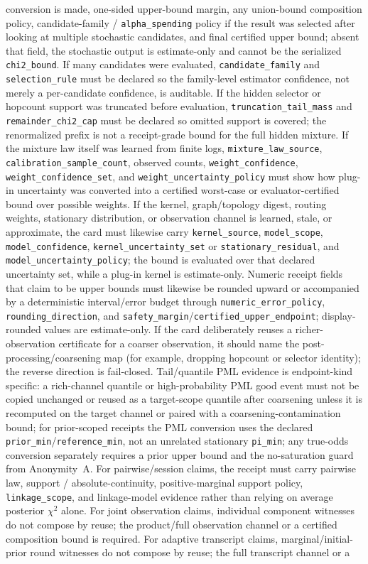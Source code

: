 \documentclass[11pt]{article}
\begin{document}
conversion is made, one-sided upper-bound margin, any union-bound composition policy, candidate-family / \nolinkurl{alpha_spending} policy if the result was selected after looking at multiple stochastic candidates, and final certified upper bound; absent that field, the stochastic output is estimate-only and cannot be the serialized \texttt{chi2\_bound}. If many candidates were evaluated, \nolinkurl{candidate_family} and \nolinkurl{selection_rule} must be declared so the family-level estimator confidence, not merely a per-candidate confidence, is auditable. If the hidden selector or hopcount support was truncated before evaluation, \nolinkurl{truncation_tail_mass} and \nolinkurl{remainder_chi2_cap} must be declared so omitted support is covered; the renormalized prefix is not a receipt-grade bound for the full hidden mixture. If the mixture law itself was learned from finite logs, \nolinkurl{mixture_law_source}, \nolinkurl{calibration_sample_count}, observed counts, \nolinkurl{weight_confidence}, \nolinkurl{weight_confidence_set}, and \nolinkurl{weight_uncertainty_policy} must show how plug-in uncertainty was converted into a certified worst-case or evaluator-certified bound over possible weights. If the kernel, graph/topology digest, routing weights, stationary distribution, or observation channel is learned, stale, or approximate, the card must likewise carry \nolinkurl{kernel_source}, \nolinkurl{model_scope}, \nolinkurl{model_confidence}, \nolinkurl{kernel_uncertainty_set} or \nolinkurl{stationary_residual}, and \nolinkurl{model_uncertainty_policy}; the bound is evaluated over that declared uncertainty set, while a plug-in kernel is estimate-only. Numeric receipt fields that claim to be upper bounds must likewise be rounded upward or accompanied by a deterministic interval/error budget through \nolinkurl{numeric_error_policy}, \nolinkurl{rounding_direction}, and \nolinkurl{safety_margin}/\nolinkurl{certified_upper_endpoint}; display-rounded values are estimate-only. If the card deliberately reuses a richer-observation certificate for a coarser observation, it should name the post-processing/coarsening map (for example, dropping hopcount or selector identity); the reverse direction is fail-closed. Tail/quantile PML evidence is endpoint-kind specific: a rich-channel quantile or high-probability PML good event must not be copied unchanged or reused as a target-scope quantile after coarsening unless it is recomputed on the target channel or paired with a coarsening-contamination bound; for prior-scoped receipts the PML conversion uses the declared \texttt{prior\_min}/\texttt{reference\_min}, not an unrelated stationary \texttt{pi\_min}; any true-odds conversion separately requires a prior upper bound and the no-saturation guard from Anonymity~A. For pairwise/session claims, the receipt must carry pairwise law, support / absolute-continuity, positive-marginal support policy, \texttt{linkage\_scope}, and linkage-model evidence rather than relying on average posterior $\chi^2$ alone. For joint observation claims, individual component witnesses do not compose by reuse; the product/full observation channel or a certified composition bound is required. For adaptive transcript claims, marginal/initial-prior round witnesses do not compose by reuse; the full transcript channel or a 
\end{document}
